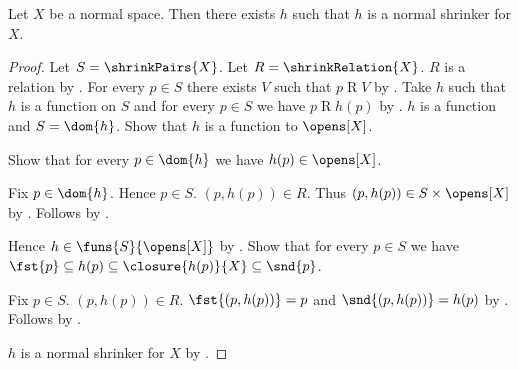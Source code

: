 \begin{theorem}\label{normal_shrinker_exists}
    Let $X$ be a normal space.
    Then there exists $h$ such that $h$ is a normal shrinker for $X$.
\end{theorem}
\begin{proof}
    Let $S=\shrinkPairs{X}$.
    Let $R=\shrinkRelation{X}$.
    $R$ is a relation by .
    For every $p\in S$ there exists $V$ such that $p\mathrel{R}V$
        by .
    Take $h$ such that $h$ is a function on $S$ and
        for every $p\in S$ we have $p\mathrel{R}h(p)$
        by .
    $h$ is a function and $S=\dom{h}$.
    Show that $h$ is a function to $\opens[X]$.
    \begin{subproof}
        Show that for every $p\in\dom{h}$ we have $h(p)\in\opens[X]$.
        \begin{subproof}
            Fix $p\in\dom{h}$.
            Hence $p\in S$.
            $(p,h(p))\in R$.
            Thus $(p,h(p))\in S\times\opens[X]$
                by .
            Follows by .
        \end{subproof}
    \end{subproof}
    Hence $h\in\funs{S}{\opens[X]}$ by .
    Show that for every $p\in S$ we have
        $\fst{p}\subseteq h(p)\subseteq\closure{h(p)}{X}
            \subseteq\snd{p}$.
    \begin{subproof}
        Fix $p\in S$.
        $(p,h(p))\in R$.
        $\fst{(p,h(p))}=p$ and $\snd{(p,h(p))}=h(p)$
            by .
        Follows by .
    \end{subproof}
    $h$ is a normal shrinker for $X$ by .
\end{proof}
